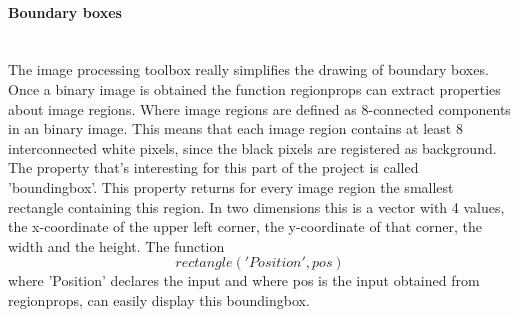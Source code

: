 \documentclass[11pt]{article}
\begin{document}
\paragraph{Boundary boxes}\mbox{}\\
The image processing toolbox really simplifies the drawing of boundary boxes. Once a binary image is obtained the function regionprops can extract properties about image regions. Where image regions are defined as 8-connected components in an binary image. This means that each image region contains at least 8 interconnected white pixels, since the black pixels are registered as background. The property that's interesting for this part of the project is called 'boundingbox'. This property returns for every image region the smallest rectangle containing this region. In two dimensions this is a vector with 4 values, the x-coordinate of the upper left corner, the y-coordinate of that corner, the width and the height. The function 
\begin{equation}
rectangle('Position', pos)
\end{equation}
where 'Position' declares the input and where pos is the input obtained from regionprops, can easily display this boundingbox. 
\end{document}
